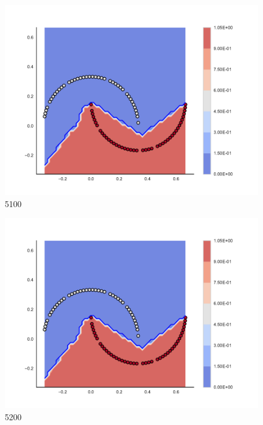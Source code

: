 \begin{subfigure}[b]{0.09\textwidth}
    \includegraphics[clip, trim=2.35cm 1.75cm 4.5cm 0cm,width=\textwidth]{img/convergence/5100.pdf}
    \caption{5100}
    \label{fig:convergence_5100}
\end{subfigure}
%
\begin{subfigure}[b]{0.09\textwidth}
    \includegraphics[clip, trim=2.35cm 1.75cm 4.5cm 0cm,width=\textwidth]{img/convergence/5200.pdf}
    \caption{5200}
    \label{fig:convergence_5200}
\end{subfigure}
%
